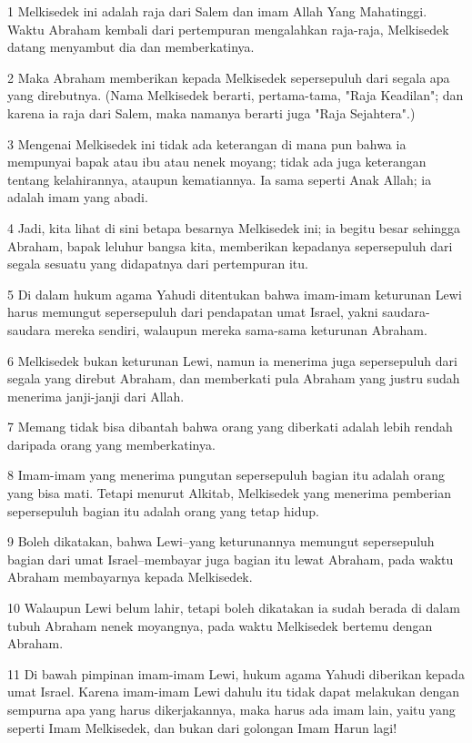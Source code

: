 \par 1 Melkisedek ini adalah raja dari Salem dan imam Allah Yang Mahatinggi. Waktu Abraham kembali dari pertempuran mengalahkan raja-raja, Melkisedek datang menyambut dia dan memberkatinya.
\par 2 Maka Abraham memberikan kepada Melkisedek sepersepuluh dari segala apa yang direbutnya. (Nama Melkisedek berarti, pertama-tama, "Raja Keadilan"; dan karena ia raja dari Salem, maka namanya berarti juga "Raja Sejahtera".)
\par 3 Mengenai Melkisedek ini tidak ada keterangan di mana pun bahwa ia mempunyai bapak atau ibu atau nenek moyang; tidak ada juga keterangan tentang kelahirannya, ataupun kematiannya. Ia sama seperti Anak Allah; ia adalah imam yang abadi.
\par 4 Jadi, kita lihat di sini betapa besarnya Melkisedek ini; ia begitu besar sehingga Abraham, bapak leluhur bangsa kita, memberikan kepadanya sepersepuluh dari segala sesuatu yang didapatnya dari pertempuran itu.
\par 5 Di dalam hukum agama Yahudi ditentukan bahwa imam-imam keturunan Lewi harus memungut sepersepuluh dari pendapatan umat Israel, yakni saudara-saudara mereka sendiri, walaupun mereka sama-sama keturunan Abraham.
\par 6 Melkisedek bukan keturunan Lewi, namun ia menerima juga sepersepuluh dari segala yang direbut Abraham, dan memberkati pula Abraham yang justru sudah menerima janji-janji dari Allah.
\par 7 Memang tidak bisa dibantah bahwa orang yang diberkati adalah lebih rendah daripada orang yang memberkatinya.
\par 8 Imam-imam yang menerima pungutan sepersepuluh bagian itu adalah orang yang bisa mati. Tetapi menurut Alkitab, Melkisedek yang menerima pemberian sepersepuluh bagian itu adalah orang yang tetap hidup.
\par 9 Boleh dikatakan, bahwa Lewi--yang keturunannya memungut sepersepuluh bagian dari umat Israel--membayar juga bagian itu lewat Abraham, pada waktu Abraham membayarnya kepada Melkisedek.
\par 10 Walaupun Lewi belum lahir, tetapi boleh dikatakan ia sudah berada di dalam tubuh Abraham nenek moyangnya, pada waktu Melkisedek bertemu dengan Abraham.
\par 11 Di bawah pimpinan imam-imam Lewi, hukum agama Yahudi diberikan kepada umat Israel. Karena imam-imam Lewi dahulu itu tidak dapat melakukan dengan sempurna apa yang harus dikerjakannya, maka harus ada imam lain, yaitu yang seperti Imam Melkisedek, dan bukan dari golongan Imam Harun lagi!
